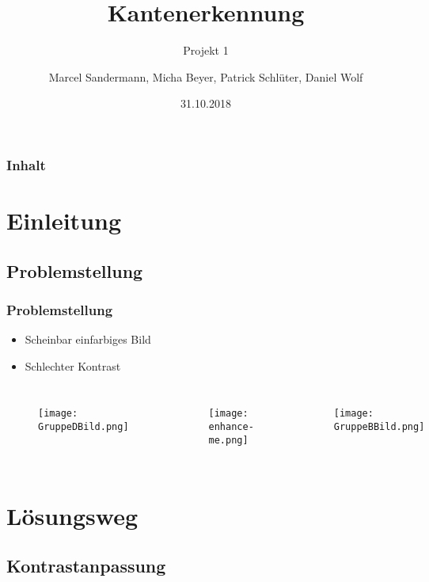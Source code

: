 \documentclass[14pt]{beamer}
\begin{document}
	\author[Gruppe D]{Marcel Sandermann, Micha Beyer, Patrick Schlüter, Daniel Wolf}
	\title{Kantenerkennung}
	\subtitle{Projekt 1}
	\date{31.10.2018}
	
	
\begin{frame}
	\titlepage
\end{frame}
\begin{frame}
	\frametitle{Inhalt}
	\tableofcontents	
\end{frame}
\section{Einleitung}
\subsection{Problemstellung}
\begin{frame}
	\frametitle{Problemstellung}
	\begin{itemize}
		\item Scheinbar einfarbiges Bild
		\item Schlechter Kontrast	
	\end{itemize}
	\begin{columns}[c]
		\begin{figure}
		\texttt{[image: GruppeDBild.png]}
		\end{figure}
		\begin{figure}
			\texttt{[image: enhance-me.png]}
		\end{figure}
		\begin{figure}
			\texttt{[image: GruppeBBild.png]}
		\end{figure}		 	
	\end{columns}
		
\end{frame}

\section{Lösungsweg}
\subsection{Kontrastanpassung}
\end{document}

